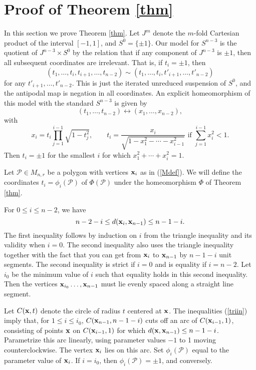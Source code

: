 \documentclass[12pt]{amsart}
\numberwithin{equation}{section}
\begin{document}
 \section{Proof of Theorem \ref{thm}}
 In this section we prove Theorem \ref{thm}.  Let $J^m$ denote the $m$-fold Cartesian product of the interval $[-1,1]$, and $S^0=\{\pm1\}$. Our model for $S^{n-3}$ is the quotient of $J^{n-3}\times S^0$
 by the relation that if any component of $J^{n-3}$ is $\pm1$, then all subsequent coordinates are irrelevant. That is, if $t_i=\pm1$, then
 \begin{equation}\label{reln}(t_1,\ldots, t_i,t_{i+1},\ldots,t_{n-2})\sim(t_1,\ldots, t_i,t'_{i+1},\ldots,t'_{n-2})\end{equation}
 for any $t'_{i+1},\ldots,t'_{n-2}$. This is just the iterated unreduced suspension of $S^0$, and the antipodal map is negation in all coordinates.
 An explicit homeomorphism of this model with the standard $S^{n-3}$ is given by
 $$(t_1,\ldots,t_{n-2})\leftrightarrow (x_1,\ldots,x_{n-2}),$$
 with $$x_i=t_i\prod_{j=1}^{i-1}\sqrt{1-t_j^2},\qquad t_i=\frac{x_i}{\sqrt{1-x_1^2-\cdots-x_{i-1}^2}}\text{ if }\sum_{j=1}^{i-1}x_i^2<1.$$
 Then $t_i=\pm1$ for the smallest $i$ for which $x_1^2+\cdots+x_i^2=1$.

Let ${{\mathcal P}}\in M_{n,r}$ be a polygon with vertices ${{\bold x}}_i$ as in (\ref{Mdef}). We will define the coordinates $t_i=\phi_i({{\mathcal P}})$ of $\Phi({{\mathcal P}})$ under the homeomorphism $\Phi$ of Theorem \ref{thm}.

For $0\le i\le n-2$, we have
\begin{equation}\label{triin}n-2-i\le d({{\bold x}}_i,{{\bold x}}_{n-1})\le n-1-i.\end{equation}
The first inequality follows by induction on $i$ from the triangle inequality and its validity when $i=0$. The second inequality also uses the triangle inequality together with the fact that you can get from ${{\bold x}}_i$ to ${{\bold x}}_{n-1}$ by $n-1-i$ unit segments. The second inequality is strict if $i=0$ and is equality if $i=n-2$.
Let $i_0$ be the minimum value of $i$ such that equality holds in this second inequality. Then the vertices ${{\bold x}}_{i_0}\ldots,{{\bold x}}_{n-1}$ must lie evenly spaced along a straight line segment.

Let $C({{\bold x}},t)$ denote the circle of radius $t$ centered at ${{\bold x}}$.
The inequalities (\ref{triin}) imply that, for $1\le i\le i_0$, $C({{\bold x}}_{n-1},n-1-i)$ cuts off an arc of $C({{\bold x}}_{i-1},1)$, consisting of points ${{\bold x}}$ on $C({{\bold x}}_{i-1},1)$ for which $d({{\bold x}},{{\bold x}}_{n-1})\le n-1-i$. Parametrize this arc linearly, using parameter values $-1$ to 1 moving counterclockwise. The vertex ${{\bold x}}_i$ lies on this arc. Set $\phi_i({{\mathcal P}})$ equal to the parameter value of ${{\bold x}}_i$. If $i=i_0$, then $\phi_i({{\mathcal P}})=\pm1$, and conversely.
\end{document}

